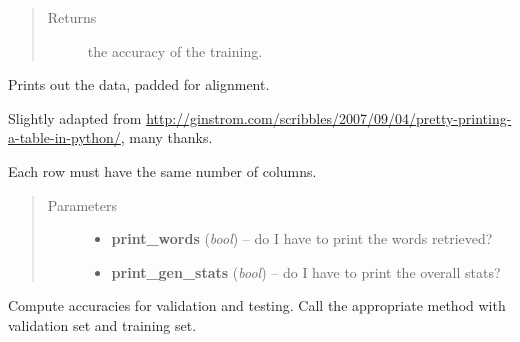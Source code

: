 \documentclass[letterpaper,10pt,english]{sphinxmanual}
\begin{document}
\begin{fulllineitems}
\begin{fulllineitems}
\begin{quote}
\begin{description}
\begin{itemize}
\end{itemize}

\item[{Returns}] \leavevmode
the accuracy of the training.

\end{description}\end{quote}

\end{fulllineitems}


\begin{fulllineitems}
\label{index:naive_bayes.Bayes.bayes_print}
Prints out the data, padded for alignment.

Slightly adapted from \href{http://ginstrom.com/scribbles/2007/09/04/pretty-printing-a-table-in-python/}{http://ginstrom.com/scribbles/2007/09/04/pretty-printing-a-table-in-python/}, many thanks.

Each row must have the same number of columns.
\begin{quote}\begin{description}
\item[{Parameters}] \leavevmode\begin{itemize}
\item {} 
\textbf{print\_words} (\emph{bool}) -- do I have to print the words retrieved?

\item {} 
\textbf{print\_gen\_stats} (\emph{bool}) -- do I have to print the overall stats?

\end{itemize}

\end{description}\end{quote}

\end{fulllineitems}


\begin{fulllineitems}
\label{index:naive_bayes.Bayes.check}
Compute accuracies for validation and testing. Call the appropriate
method with validation set and training set.

\end{fulllineitems}



\end{fulllineitems}
\end{document}
